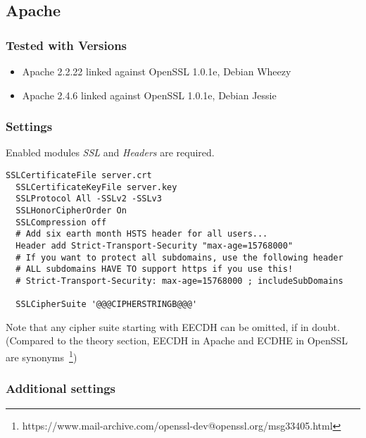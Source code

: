 
\subsection{Apache}

\subsubsection{Tested with Versions} 
\begin{itemize}
\item Apache 2.2.22 linked against OpenSSL 1.0.1e, Debian Wheezy
\item Apache 2.4.6 linked against OpenSSL 1.0.1e, Debian Jessie
\end{itemize}


\subsubsection{Settings} 

Enabled modules \emph{SSL} and \emph{Headers} are required.

\begin{lstlisting}[breaklines]
  SSLCertificateFile server.crt
  SSLCertificateKeyFile server.key
  SSLProtocol All -SSLv2 -SSLv3 
  SSLHonorCipherOrder On
  SSLCompression off
  # Add six earth month HSTS header for all users...
  Header add Strict-Transport-Security "max-age=15768000"
  # If you want to protect all subdomains, use the following header
  # ALL subdomains HAVE TO support https if you use this!
  # Strict-Transport-Security: max-age=15768000 ; includeSubDomains

  SSLCipherSuite '@@@CIPHERSTRINGB@@@'

\end{lstlisting}

Note that any cipher suite starting with EECDH can be omitted, if in doubt.
(Compared to the theory section, EECDH in Apache and ECDHE in OpenSSL are
synonyms~\footnote{https://www.mail-archive.com/openssl-dev@openssl.org/msg33405.html})

\subsubsection{Additional settings}


